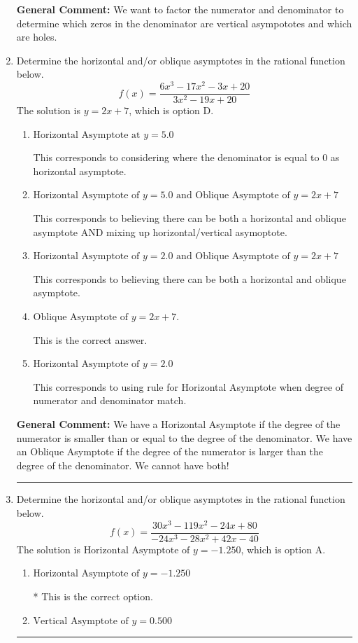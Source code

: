 \documentclass{extbook}[14pt]
\newcommand{\litem}[1]{\item #1

\rule{\textwidth}{0.4pt}}
\begin{document}
\begin{enumerate}
{\textbf{General Comment:} We want to factor the numerator and denominator to determine which zeros in the denominator are vertical asympototes and which are holes.
}
\litem{
Determine the horizontal and/or oblique asymptotes in the rational function below.
\[ f(x) = \frac{6x^{3} -17 x^{2} -3 x + 20}{3x^{2} -19 x + 20} \]The solution is \( y = 2x + 7 \), which is option D.\begin{enumerate}[label=\Alph*.]
\item \( \text{Horizontal Asymptote at } y = 5.0 \)

This corresponds to considering where the denominator is equal to 0 as horizontal asymptote.
\item \( \text{Horizontal Asymptote of } y = 5.0 \text{ and Oblique Asymptote of } y = 2x + 7 \)

This corresponds to believing there can be both a horizontal and oblique asymptote AND mixing up horizontal/vertical asymoptote.
\item \( \text{Horizontal Asymptote of } y = 2.0 \text{ and Oblique Asymptote of } y = 2x + 7 \)

This corresponds to believing there can be both a horizontal and oblique asymptote.
\item \( \text{Oblique Asymptote of } y = 2x + 7. \)

This is the correct answer.
\item \( \text{Horizontal Asymptote of } y = 2.0  \)

This corresponds to using rule for Horizontal Asymptote when degree of numerator and denominator match.
\end{enumerate}

\textbf{General Comment:} We have a Horizontal Asymptote if the degree of the numerator is smaller than or equal to the degree of the denominator. We have an Oblique Asymptote if the degree of the numerator is larger than the degree of the denominator. We cannot have both!
}
\litem{
Determine the horizontal and/or oblique asymptotes in the rational function below.
\[ f(x) = \frac{30x^{3} -119 x^{2} -24 x + 80}{-24x^{3} -28 x^{2} +42 x -40} \]The solution is \( \text{Horizontal Asymptote of } y = -1.250  \), which is option A.\begin{enumerate}[label=\Alph*.]
\item \( \text{Horizontal Asymptote of } y = -1.250  \)

* This is the correct option.
\item \( \text{Vertical Asymptote of } y = 0.500  \)


\end{enumerate}}
\end{enumerate}
\end{document}
